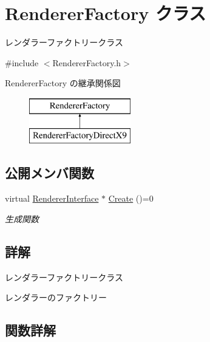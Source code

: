 \hypertarget{class_renderer_factory}{}\section{Renderer\+Factory クラス}
\label{class_renderer_factory}


レンダラーファクトリークラス  




{\ttfamily \#include $<$Renderer\+Factory.\+h$>$}

Renderer\+Factory の継承関係図\begin{figure}[H]
\begin{center}
\leavevmode
\includegraphics[height=2.000000cm]{class_renderer_factory}
\end{center}
\end{figure}
\subsection*{公開メンバ関数}
\begin{DoxyCompactItemize}
\item 
virtual \mbox{\hyperlink{class_renderer_interface}{Renderer\+Interface}} $\ast$ \mbox{\hyperlink{class_renderer_factory_a1907fb4787bf1abdf48443c1e87c0f13}{Create}} ()=0
\begin{DoxyCompactList}\small\item\em 生成関数 \end{DoxyCompactList}\end{DoxyCompactItemize}


\subsection{詳解}
レンダラーファクトリークラス 

レンダラーのファクトリー 

\subsection{関数詳解}
\mbox{\label{class_renderer_factory_a1907fb4787bf1abdf48443c1e87c0f13}} 
